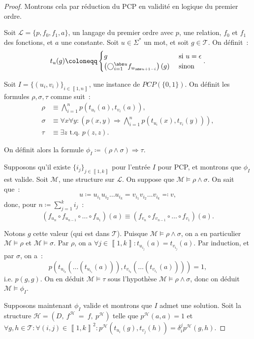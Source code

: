 \documentclass{article}
\theoremstyle{definition}
\theoremstyle{remark}
\newcommand{\intint}[2]{\left\llbracket#1, #2\right\rrbracket}
\newcommand{\tq}{\text{ t.q. }}
\begin{document}
		\begin{proof} Montrons cela par réduction du PCP en validité en logique du premier ordre.

		Soit $\mathcal L = \{p, f_0, f_1, a\}$, un langage du premier ordre avec $p$, une relation, $f_0$ et $f_1$ des fonctions, et $a$ une constante.
		Soit $u \in \Sigma^*$ un mot, et soit $g \in \mathcal T$. On définit~:
		\[t_u(g) \coloneqq \begin{cases}g &\text{ si } u=\epsilon\\\left(\bigcirc_{i=1}^{\abs u}f_{u_{\abs u+1-i}}\right)(g) &\text{ sinon}\end{cases}.\]

		Soit $I = \{(u_i, v_i)\}_{i \in \intint 1n}$, une instance de $PCP(\{0, 1\})$. On définit les formules $\rho, \sigma, \tau$ comme suit~:
		\begin{align*}
			\rho &\equiv \bigwedge_{i=1}^np(t_{u_i}(a), t_{v_i}(a)), \\
			\sigma &\equiv \forall x \forall y : \left(p(x, y) \Rightarrow \bigwedge_{i=1}^np(t_{u_i}(x), t_{v_i}(y))\right), \\
			\tau &\equiv \exists z \tq p(z, z).
		\end{align*}

		On définit alors la formule $\phi_I \coloneqq (\rho \land \sigma) \Rightarrow \tau$.

		Supposons qu'il existe $\{i_j\}_{j \in \intint 1k}$ pour l'entrée $I$ pour PCP, et montrons que $\phi_I$ est valide. Soit $\mathcal M$, une structure sur
		$\mathcal L$. On suppose que $\mathcal M \models \rho \land \sigma$. On sait que~:
		\[u \coloneqq u_{i_1}u_{i_2}\ldots u_{i_k} = v_{i_1}v_{i_2}\ldots v_{i_k} \eqqcolon v,\]
		donc, pour $n \coloneqq \sum_{j=1}^ki_j$~:
		\[\left(f_{u_n} \circ f_{u_{n-1}} \circ \ldots \circ f_{u_1}\right)(a) \equiv \left(f_{v_n} \circ f_{v_{n-1}} \circ \ldots \circ f_{v_1}\right)(a).\]

		Notons $g$ cette valeur (qui est dans $\mathcal T$). Puisque $\mathcal M \models \rho \land \sigma$, on a en particulier $\mathcal M \models \rho$
		et $\mathcal M \models \sigma$. Par $\rho$, on a $\forall j \in \intint 1k : t_{u_{i_j}}(a) = t_{v_{i_j}}(a)$. Par induction, et par $\sigma$, on a~:
		\[p\left(t_{u_{i_k}}( \ldots(t_{u_{i_1}}(a))), t_{v_{i_k}}(\ldots(t_{v_{i_1}}(a)))\right) = 1,\]
		i.e. $p(g, g)$. On en déduit $\mathcal M \models \tau$ sous l'hypothèse $\mathcal M \models \rho \land \sigma$, donc on déduit $\mathcal M \models \phi_I$.

		Supposons maintenant $\phi_I$ valide et montrons que $I$ admet une solution. Soit la structure $\mathcal H = (D,~f^{\mathcal H}~=~f,~p^{\mathcal H})$
		telle que $p^{\mathcal H}(a, a)=1$ et
		$\forall g, h \in \mathcal T : \forall (i, j) \in \intint 1k^2 : p^{\mathcal H}(t_{u_i}(g), t_{v_j}(h)) = \delta_i^jp^{\mathcal H}(g, h)$.


\end{proof}
\end{document}
